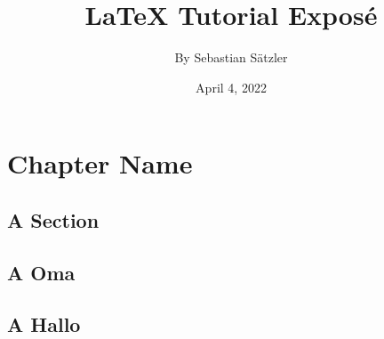 \documentclass[a4paper, 12pt]{book}
\begin{document}
\title{\Large{\textbf{LaTeX Tutorial Expos\'e}}}
\author{By Sebastian Sätzler}
\date{April 4, 2022}

\maketitle
\let\cleardoublepage\clearpage
\tableofcontents

\setcounter{page}{2}


\chapter{Chapter Name}

\blindmathtrue
\blindtext[5]

\section{A Section}



\section{A Oma}
\blindtext[2]
\pagebreak


\section{A Hallo}
\end{document}

